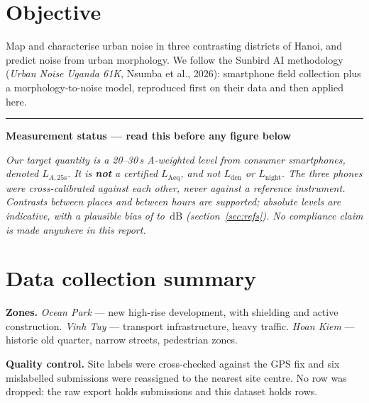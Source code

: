 \documentclass[11pt,a4paper]{article}
\newcommand{\LAt}{$L_{A,25\mathrm{s}}$}
\newcommand{\dB}{\ensuremath{\,\mathrm{dB}}}
\newenvironment{caveat}[1]
  {\par\medskip\noindent\begin{minipage}{\linewidth}%
   \color{warnc}\rule{2pt}{\baselineskip}\hspace{.6em}\textbf{#1}\par\vspace{.2em}
   \hspace*{1.4em}\begin{minipage}{\dimexpr\linewidth-1.4em\relax}\small\itshape}
  {\end{minipage}\end{minipage}\par\medskip}
\begin{document}
\section{Objective}

Map and characterise urban noise in three contrasting districts of Hanoi, and
predict noise from urban morphology. We follow the Sunbird AI methodology
(\emph{Urban Noise Uganda 61K}, Nsumba et al., 2026): smartphone field collection
plus a morphology-to-noise model, reproduced first on their data and then applied
here.

\begin{caveat}{Measurement status --- read this before any figure below}
  Our target quantity is a 20--30\,s A-weighted level from consumer smartphones,
  denoted \LAt{}. It is \textbf{not} a certified $L_\mathrm{Aeq}$, and not
  $L_\mathrm{den}$ or $L_\mathrm{night}$. The three phones were cross-calibrated
  against \emph{each other}, never against a reference instrument. Contrasts
  between places and between hours are supported; absolute levels are indicative,
  with a plausible bias of \biasLo{} to \biasHi{}\dB{} (section~\ref{sec:refs}).
  No compliance claim is made anywhere in this report.
\end{caveat}

\section{Data collection summary}

\begin{table}[h]
  \centering\small
  
  \caption{Field campaign by site. \emph{Roadside} pools the three survey bins
  that mean ``within 10\,m of a road''; the form changed mid-campaign and v1
  offered a single 0--10\,m bin where v2 splits 0--2\,m from 2--10\,m.}
\end{table}

\noindent
\textbf{Zones.} \emph{Ocean Park} --- new high-rise development, with shielding
and active construction. \emph{Vinh Tuy} --- transport infrastructure, heavy
traffic. \emph{Hoan Kiem} --- historic old quarter, narrow streets, pedestrian
zones.

\medskip\noindent
\textbf{Quality control.} Site labels were cross-checked against the GPS fix and
six mislabelled submissions were reassigned to the nearest site centre. No row
was dropped: the raw export holds \nMeas{} submissions and this dataset holds
\nMeas{} rows.
\end{document}
